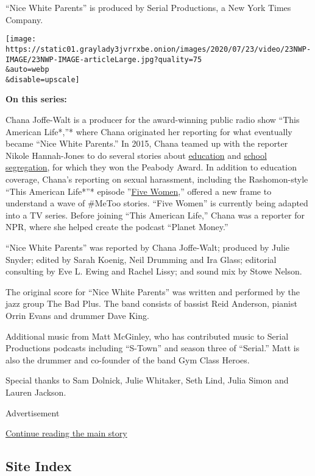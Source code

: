 ``Nice White Parents'' is produced by Serial Productions, a New York
Times Company.

\texttt{[image: https://static01.graylady3jvrrxbe.onion/images/2020/07/23/video/23NWP-IMAGE/23NWP-IMAGE-articleLarge.jpg?quality=75\\\&auto=webp\\\&disable=upscale]}

\textbf{On this series:}

Chana Joffe-Walt is a producer for the award-winning public radio show
``This American Life*,''* where Chana originated her reporting for what
eventually became ``Nice White Parents.'' In 2015, Chana teamed up with
the reporter Nikole Hannah-Jones to do several stories about
\href{https://www.thisamericanlife.org/550/three-miles}{education} and
\href{https://www.thisamericanlife.org/562/the-problem-we-all-live-with-part-one}{school
segregation}, for which they won the Peabody Award. In addition to
education coverage, Chana's reporting on sexual harassment, including
the Rashomon-style ``This American Life*''* episode
''\href{https://www.thisamericanlife.org/640/five-women}{Five Women},''
offered a new frame to understand a wave of \#MeToo stories. ``Five
Women'' is currently being adapted into a TV series. Before joining
``This American Life,'' Chana was a reporter for NPR, where she helped
create the podcast ``Planet Money.''

``Nice White Parents'' was reported by Chana Joffe-Walt; produced by
Julie Snyder; edited by Sarah Koenig, Neil Drumming and Ira Glass;
editorial consulting by Eve L. Ewing and Rachel Lissy; and sound mix by
Stowe Nelson.

The original score for ``Nice White Parents'' was written and performed
by the jazz group The Bad Plus. The band consists of bassist Reid
Anderson, pianist Orrin Evans and drummer Dave King.

Additional music from Matt McGinley, who has contributed music to Serial
Productions podcasts including ``S-Town'' and season three of
``Serial.'' Matt is also the drummer and co-founder of the band Gym
Class Heroes.

Special thanks to Sam Dolnick, Julie Whitaker, Seth Lind, Julia Simon
and Lauren Jackson.

Advertisement

\protect\hyperlink{after-bottom}{Continue reading the main story}

\hypertarget{site-index}{%
\subsection{Site Index}\label{site-index}}

